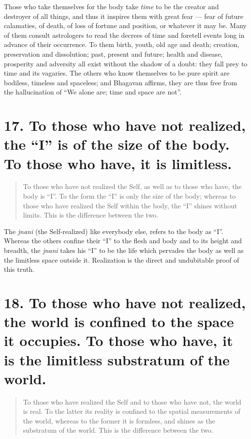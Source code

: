 \documentclass[12pt]{report}
\begin{document}
Those who take themselves for the body take \emph{time} to be the
creator and destroyer of all things, and thus it inspires them with
great fear --- fear of future calamaties, of death, of loss of fortune
and position, or whatever it may be. Many of them consult astrologers
to read the decrees of time and foretell events long in advance of
their occurrence. To them birth, youth, old age and death; creation,
preservation and dissolution; past, present and future; health and
disease, prosperity and adversity all exist without the shadow of a
doubt: they fall prey to time and its vagaries. The others who know
themselves to be pure spirit are bodiless, timeless and spaceless; and
Bhagavan affirms, they are thus free from the hallucination of ``We
alone are; time and space are not''.

\section{17. To those who have not realized, the ``I'' is of the size
  of the body. To those who have, it is limitless.}

\begin{quote}
  To those who have not realized the Self, as well as to those who
  have, the body is ``I''. To the form the ``I'' is only the size of
  the body; whereas to those who have realized the Self within the
  body, the ``I'' shines without limits. This is the difference
  between the two.
\end{quote}


The \emph{jnani} (the Self-realized) like everybody else, refers to
the body as ``I''. Whereas the others confine their ``I'' to the flesh
and body and to its height and breadth, the \emph{jnani} takes his
``I'' to be the life which pervades the body as well as the limitless
space outside it. Realization is the direct and undubitable proof of
this truth. 

\section{18. To those who have not realized, the world is confined to
  the space it occupies. To those who have, it is the limitless
  substratum of the world.}

\begin{quote}
  To those who have realized the Self and to those who have not, the
  world is real. To the latter its reality is confined to the spatial
  measurements of the world, whereas to the former it is formless, and
  shines as the substratum of the world. This is the difference
  between the two.
\end{quote}
\end{document}
